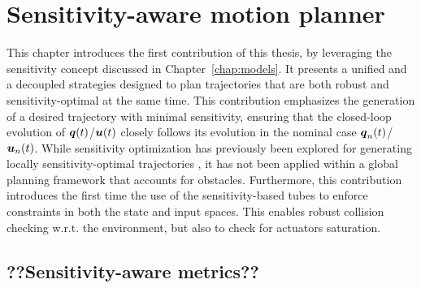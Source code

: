 \chapter{Sensitivity-aware motion planner}

This chapter introduces the first contribution of this thesis, by leveraging the sensitivity concept discussed in Chapter~\ref{chap:models}.
It presents a unified and a decoupled strategies designed to plan trajectories that are both robust and sensitivity-optimal at the same time.
This contribution emphasizes the generation of a desired trajectory with minimal sensitivity, ensuring that the closed-loop evolution of $\boldsymbol{q}(t)$/$\boldsymbol{u}(t)$ closely follows its evolution in the nominal case $\boldsymbol{q}_n(t)$/$\boldsymbol{u}_n(t)$.
While sensitivity optimization has previously been explored for generating locally sensitivity-optimal trajectories \cite{cPi, cTh}, it has not been applied within a global planning framework that accounts for obstacles.
Furthermore, this contribution introduces the first time the use of the sensitivity-based tubes to enforce constraints in both the state and input spaces.
This enables robust collision checking w.r.t. the environment, but also to check for actuators saturation.



\section{??Sensitivity-aware metrics??}

